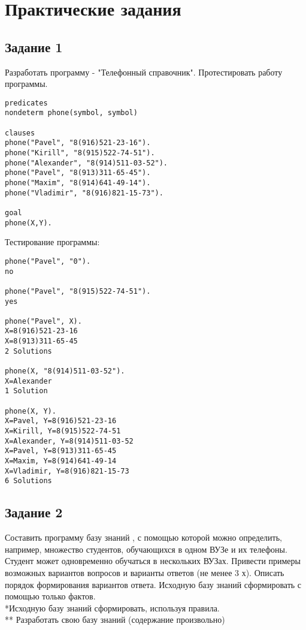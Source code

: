 \chapter{Практические задания}
\section{Задание 1}
Разработать программу - "Телефонный справочник". Протестировать работу программы.
\begin{lstlisting}
predicates
nondeterm phone(symbol, symbol)

clauses
phone("Pavel", "8(916)521-23-16").
phone("Kirill", "8(915)522-74-51").
phone("Alexander", "8(914)511-03-52").
phone("Pavel", "8(913)311-65-45").
phone("Maxim", "8(914)641-49-14").
phone("Vladimir", "8(916)821-15-73").

goal
phone(X,Y).
\end{lstlisting}

Тестирование программы:\\
\begin{lstlisting}
phone("Pavel", "0").
no

phone("Pavel", "8(915)522-74-51"). 
yes

phone("Pavel", X).
X=8(916)521-23-16
X=8(913)311-65-45
2 Solutions	

phone(X, "8(914)511-03-52").
X=Alexander
1 Solution  

phone(X, Y).
X=Pavel, Y=8(916)521-23-16
X=Kirill, Y=8(915)522-74-51
X=Alexander, Y=8(914)511-03-52
X=Pavel, Y=8(913)311-65-45
X=Maxim, Y=8(914)641-49-14
X=Vladimir, Y=8(916)821-15-73
6 Solutions
\end{lstlisting}

\section{Задание 2}
Составить программу базу знаний , с помощью которой можно определить, например, множество студентов, обучающихся в одном ВУЗе и их телефоны. Студент может одновременно обучаться в нескольких ВУЗах. Привести примеры возможных вариантов вопросов и варианты ответов (не менее 3 х). Описать порядок формирования вариантов ответа. Исходную базу знаний сформировать с помощью только фактов.\\
*Исходную базу знаний сформировать, используя правила.\\
** Разработать свою базу знаний (содержание произвольно)\\

